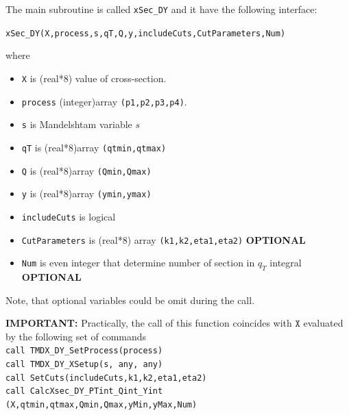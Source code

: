 \documentclass[prd,nofootinbib,eqsecnum,final]{revtex4}
\renewcommand{\(}{\left(}
\renewcommand{\)}{\right)}
\renewcommand{\[}{\left[}
\renewcommand{\]}{\right]}
\newcommand{\red}[1]{{\color[rgb]{1,0,0} #1}}
\begin{document}
\begin{tcolorbox}
The main subroutine is called \texttt{xSec\_DY} and it have the following interface:

\begin{center}
\texttt{xSec\_DY(X,process,s,qT,Q,y,includeCuts,CutParameters,Num)}
\end{center}

where
\begin{itemize}
\item \texttt{X} is (real*8) value of cross-section.
\item \texttt{process} (integer)array \texttt{(p1,p2,p3,p4)}.
\item \texttt{s} is Mandelshtam variable $s$
\item \texttt{qT} is (real*8)array \texttt{(qtmin,qtmax)}
\item \texttt{Q} is (real*8)array \texttt{(Qmin,Qmax)}
\item \texttt{y} is (real*8)array \texttt{(ymin,ymax)}
\item \texttt{includeCuts} is logical
\item \texttt{CutParameters} is (real*8) array \texttt{(k1,k2,eta1,eta2)} \textbf{OPTIONAL}
\item \texttt{Num} is even integer that determine number of section in $q_T$ integral \textbf{OPTIONAL}
\end{itemize}
Note, that optional variables could be omit during the call. 
\end{tcolorbox}
\textbf{IMPORTANT: } Practically, the call of this function coincides with $\texttt{X}$ evaluated by the following set of commands
\\
\texttt{call TMDX\_DY{\_}SetProcess(process)}
\\
\texttt{call TMDX\_DY{\_}XSetup(s,\red{any},\red{any})}
\\
\texttt{call SetCuts(includeCuts,k1,k2,eta1,eta2)}
\\
\texttt{call CalcXsec\_DY{\_}PTint{\_}Qint{\_}Yint} \texttt{(X,qtmin,qtmax,Qmin,Qmax,yMin,yMax,Num)}
\end{document}
